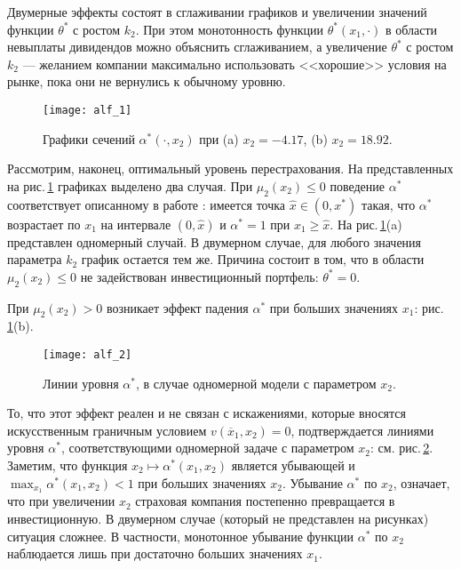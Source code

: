 Двумерные эффекты состоят в сглаживании графиков и увеличении значений функции $\theta^*$ с ростом $k_2$. При этом монотонность функции $\theta^*(x_1,\cdot)$ в области невыплаты дивидендов можно объяснить сглаживанием, а увеличение $\theta^*$ с ростом $k_2$ --- желанием компании максимально использовать <<хорошие>> условия на рынке, пока они не вернулись к обычному уровню.
\begin{figure}[h!]
        \centering
          \texttt{[image: alf\_1]}
         \caption{Графики сечений $\alpha^*(\cdot,x_2)$ при (a) $x_2=-4.17$, (b) $x_2=18.92$.}
          \label{fig:1.5}
\end{figure}

Рассмотрим, наконец, оптимальный уровень перестрахования. На представленных на рис.\,\ref{fig:1.5} графиках выделено два случая. При $\mu_2(x_2) \le 0$ поведение $\alpha^*$ соответствует описанному в работе \cite{AsmHojTak00}: имеется точка $\hat x \in (0,x^*)$ такая, что $\alpha^*$ возрастает по $x_1$ на интервале $(0,\hat x)$ и $\alpha^*=1$ при $x_1 \ge \hat x$. На рис.\,\ref{fig:1.5}(a) представлен одномерный случай. В двумерном случае, для любого значения параметра $k_2$ график остается тем же. Причина состоит в том, что в области $\mu_2(x_2) \le 0$ не задействован инвестиционный портфель: $\theta^*=0$.

При $\mu_2(x_2)>0$ возникает эффект падения $\alpha^*$ при больших значениях $x_1$: рис.\,\ref{fig:1.5}(b).
\begin{figure}[h!]
        \centering
          \texttt{[image: alf\_2]}
         \caption{Линии уровня $\alpha^*$, в случае одномерной модели с параметром $x_2$.}
          \label{fig:1.6}
\end{figure}
То, что этот эффект реален и не связан с искажениями, которые вносятся искусственным граничным условием $v(\overline x_1, x_2)=0$,
подтверждается линиями уровня $\alpha^*$, соответствующими одномерной задаче с параметром $x_2$: см. рис.\,\ref{fig:1.6}. Заметим, что функция $x_2\mapsto\alpha^*(x_1,x_2)$ является убывающей и $\max_{x_1}{\alpha^*}(x_1,x_2)<1$ при больших значениях $x_2$.
Убывание $\alpha^*$ по $x_2$, означает, что при увеличении $x_2$ страховая компания постепенно превращается в инвестиционную. В двумерном случае (который не представлен на рисунках) ситуация сложнее. В частности, монотонное убывание функции $\alpha^*$ по $x_2$ наблюдается лишь при достаточно больших значениях $x_1$.


\clearpage 